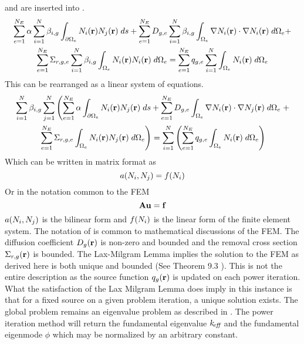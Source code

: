      and  are inserted 
    into .
    \begin{multline}
      \sum_{e=1}^{N_E} \alpha \sum_{i=1}^{N} \beta_{i,g}
        \int_{\partial \Omega_e}
        N_i(\mathbf{r})  N_j(\mathbf{r}) \;ds +
        \sum_{e=1}^{N_E} D_{g,e} \sum_{i=1}^{N} \beta_{i,g}
        \int_{\Omega_e} \mathbf{\nabla} N_i(\mathbf{r}) \cdot \mathbf{\nabla} N_i(\mathbf{r})\;d\Omega_e
        + \\
        \sum_{e=1}^{N_E} \Sigma_{r,g,e} \sum_{i=1}^{N} \beta_{i,g}
        \int_{\Omega_e} N_i(\mathbf{r}) N_i(\mathbf{r}) \; d\Omega_e =
        \sum_{e=1}^{N_E} q_{g,e} \sum_{i=1}^{N} 
        \int_{\Omega_e} N_i(\mathbf{r}) \; d\Omega_e
    \end{multline}
    This can be rearranged as a linear system of equations.
    \begin{multline}
      \sum_{i=1}^{N} \beta_{i,g} \sum_{j=1}^{N} \left(
        \sum_{e=1}^{N_E} \alpha \int_{\partial \Omega_e}
        N_i(\mathbf{r})  N_j(\mathbf{r}) \;ds +
        \sum_{e=1}^{N_E} D_{g,e} 
        \int_{\Omega_e} \mathbf{\nabla} N_i(\mathbf{r}) \cdot \mathbf{\nabla} N_j(\mathbf{r})\;d\Omega_e
        \right.
        + \\
        \left.
        \sum_{e=1}^{N_E} \Sigma_{r,g,e}
        \int_{\Omega_e} N_i(\mathbf{r}) N_j(\mathbf{r}) \; d\Omega_e \right) =
        \sum_{i=1}^{N} \left(
        \sum_{e=1}^{N_E} q_{g,e} 
        \int_{\Omega_e} N_i(\mathbf{r}) \; d\Omega_e \right)
    \end{multline}
    Which can be written in matrix format as
    \begin{equation}
      \label{eq:fem_notation}
      a(N_i,N_j) = f(N_i)
    \end{equation}
    Or in the notation common to the FEM
    \begin{equation}
      \label{eq:matrix_notation}
      \mathbf{A} \mathbf{u} = \mathbf{f}
    \end{equation}
    $a(N_i,N_j)$ is the bilinear form and $f(N_i)$ is the linear 
    form of the finite element system. The notation of  is
    common to mathematical discussions of the FEM. The diffusion coefficient 
    $D_g(\mathbf{r})$ is non-zero and bounded and the removal cross section 
    $\Sigma_{r,g}(\mathbf{r})$ is bounded. The Lax-Milgram Lemma implies the solution
    to the FEM as derived here is both unique and bounded (See Theorem 9.3
    \cite{textbookli}). This is 
    not the entire description as the source function $q_g(\mathbf{r})$ is updated on 
    each power iteration. What the satisfaction of the Lax Milgram Lemma does 
    imply in this instance is that for a fixed source on a given problem 
    iteration, a unique solution exists. The global problem remains an 
    eigenvalue problem as described in \cite{duderstathamilton}. The power
    iteration method will 
    return the fundamental eigenvalue $k_{\!\mbox{\scriptsize \em eff}}$ and the fundamental 
    eigenmode $\phi$ which may be normalized by an arbitrary constant.
    
